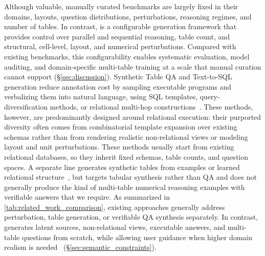 Although valuable, manually curated benchmarks are largely fixed in their domains, layouts, question distributions, perturbations, reasoning regimes, and number of tables. In contrast, \name is a configurable generation framework that provides control over parallel and sequential reasoning, table count, and structural, cell-level, layout, and numerical perturbations. Compared with existing benchmarks, this configurability enables systematic evaluation, model auditing, and domain-specific multi-table training at a scale that manual curation cannot support (\S\ref{sec:discussion}). 
Synthetic Table QA and Text-to-SQL generation reduce annotation cost by sampling executable programs and verbalizing them into natural language, using SQL templates, query-diversification methods, or relational multi-hop constructions~\cite{9.2,9.5,9.6,9.7,9.8,5.5,5.8}. These methods, however, are predominantly designed around relational execution: their purported diversity often comes from combinatorial template expansion over existing schemas rather than from rendering realistic non-relational views or modeling layout and unit perturbations. These methods usually start from existing relational databases, so they inherit fixed schemas, table counts, and question spaces. A separate line generates synthetic tables from examples or learned relational structure~\cite{5.1,5.9,5.10,5.2}, but targets tabular synthesis rather than QA and does not generally produce the kind of multi-table numerical reasoning examples with verifiable answers that we require. As summarized in \autoref{tab:related_work_comparison}, existing approaches generally address perturbation, table generation, or verifiable QA synthesis separately. 
In contrast, \name generates latent sources, non-relational views, executable answers, and multi-table questions from scratch, while allowing user guidance when higher domain realism is needed~\cite{5.12} (§\ref{sec:semantic_constraints}). 
